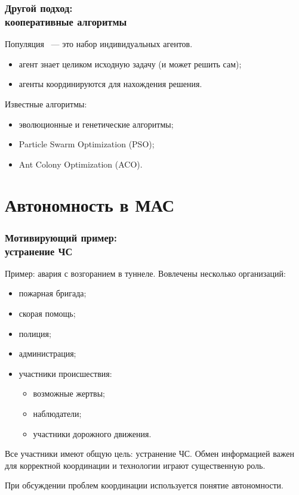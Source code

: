 \documentclass{beamer}
\begin{document}
\begin{frame}
  \frametitle{Другой подход: \\ кооперативные алгоритмы}
  Популяция ~--- это набор индивидуальных агентов.
  \begin{itemize}
    \item агент знает целиком исходную задачу (и может решить сам);
    \item агенты координируются для нахождения решения.
  \end{itemize}

  Известные алгоритмы:
  \begin{itemize}
    \item эволюционные и генетические алгоритмы;
    \item Particle Swarm Optimization (PSO);
    \item Ant Colony Optimization (ACO).
  \end{itemize}
\end{frame}

\section{Автономность в МАС}

\begin{frame}
  \frametitle{Мотивирующий пример: \\ устранение ЧС}
  Пример: авария с возгоранием в туннеле. Вовлечены несколько организаций:
  \begin{itemize}
    \item пожарная бригада;
    \item скорая помощь;
    \item полиция;
    \item администрация;
    \item участники происшествия:
      \begin{itemize}
        \item возможные жертвы;
        \item наблюдатели;
        \item участники дорожного движения.
      \end{itemize}
  \end{itemize}

  Все участники имеют общую цель: устранение ЧС. Обмен информацией важен для корректной
  координации и технологии играют существенную роль.

  При обсуждении проблем координации используется понятие автономности.
\end{frame}
\end{document}
